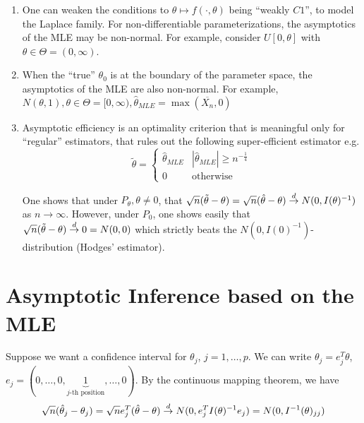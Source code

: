 \begin{remark}
  \begin{enumerate}
  \item One can weaken the conditions to $\theta \mapsto f(\cdot,
    \theta)$ being ``weakly $C1$'', to model the Laplace family. For
    non-differentiable parameterizations, the asymptotics of the MLE
    may be non-normal. For example, consider $U[0, \theta]$ with
    $\theta \in \Theta = (0, \infty)$.
  \item When the ``true'' $\theta_{0}$ is at the boundary of the
    parameter space, the asymptotics of the MLE are also non-normal.
    For example, $N(\theta, 1), \theta \in \Theta = [0, \infty), \hat
    \theta_{MLE} = \max(\overline{X_{n}}, 0)$
  \item Asymptotic efficiency is an optimality criterion that is
    meaningful only for ``regular'' estimators, that rules out the
    following super-efficient estimator e.g.
    \begin{equation}
      \label{eq:67}
      \tilde \theta =
      \begin{cases}
        \hat \theta_{MLE} & |\hat \theta_{MLE}| \geq n^{-\frac{1}{4}} \\
        0 & \text{otherwise}
      \end{cases}
    \end{equation}

    One shows that under $P_{\theta}, \theta \neq 0$, that
    $\sqrt{n}(\tilde \theta - \theta) = \sqrt{n}(\hat \theta -
    \theta) \overset{d}{\rightarrow} N(0, I(\theta)^{-1})$ as $n \rightarrow \infty$.
    However, under $P_{0}$, one shows easily that $\sqrt{n}(\tilde
    \theta - \theta) \overset{d}{\rightarrow} 0 = N(0, 0)$ which strictly beats the $N(0,
    I(0)^{-1})$-distribution (Hodges' estimator).
  \end{enumerate}
\end{remark}


\section{Asymptotic Inference based on the MLE}
\label{sec:asmpt-infer-based}

Suppose we want a confidence interval for $\theta_{j}$, $j = 1, \dots,
p$.   We can write $\theta_{j} = e_{j}^{T} \theta$, $e_{j} = (0,
\dots, 0, \underbrace{1}_{\text{$j$-th position}}, \dots, 0)$.  By the
continuous mapping theorem, we have
\begin{align}
  \label{eq:68}
  \sqrt{n} (\hat \theta_{j} - \theta_{j}) = \sqrt{n} e_{j}^{T}(\hat
  \theta - \theta) \overset{d}{\rightarrow} N(0, e_{j}^{T} I(\theta)^{-1}e_{j}) = N(0, I^{-1}(\theta)_{jj})
\end{align}


